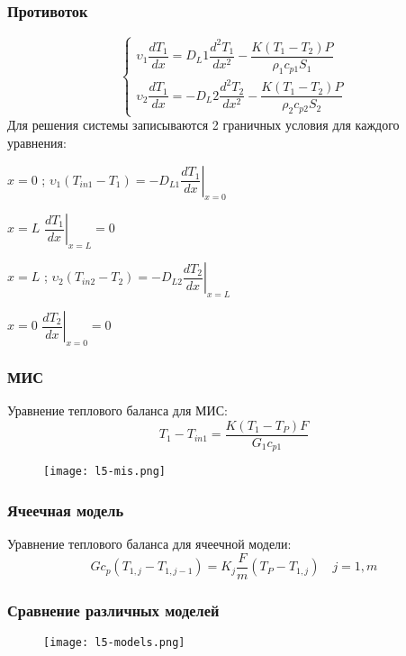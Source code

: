 \begin{frame}
	\frametitle{Противоток}
	\begin{equation}
	\left\lbrace 
	\begin{gathered} 
	\upsilon_1 \dfrac {dT_1} {dx} = D_L1 \dfrac {d^2 T_1} {dx^2} - \dfrac {K(T_1-T_2) P} {\rho_1 c_{p1} S_1} \\
	\upsilon_2 \dfrac {dT_1} {dx} = - D_L2 \dfrac {d^2 T_2} {dx^2} - \dfrac {K(T_1-T_2) P} {\rho_2 c_{p2} S_2} 
	\end{gathered} 
	\right.
	\end{equation}
	Для решения системы записываются 2 граничных условия для каждого уравнения:
	
	$x=0$ ; \quad $\upsilon_1 ( T_{in1} - T_1 ) = -D_{L1} \left.  \dfrac { d T_1 } { dx }  \right| _{ x=0 }$
	
	$x=L$ \quad $ \left. \dfrac { d T_1 } { dx }  \right|_{ x=L } =0$
	
	$x=L$ ; \quad $\upsilon_2 ( T_{in2} - T_2 ) = -D_{L2} \left.  \dfrac { d T_2 } { dx }  \right| _{ x=L }$
	
	$x=0$ \quad $ \left. \dfrac { d T_2 } { dx }  \right|_{ x=0 } =0$
	
\end{frame}

\begin{frame}
	\frametitle{МИС}
	Уравнение теплового баланса для МИС:
	\begin{equation}
		T_1-T_{in 1}=\dfrac { K(T_1 - T_{P} )F} { G_1 c_{p1} }
	\end{equation}
	
	\begin{figure}[h]
		\texttt{[image: l5-mis.png]}
	\end{figure}
\end{frame}

\begin{frame}
	\frametitle{Ячеечная модель}
	Уравнение теплового баланса для ячеечной модели:
	\begin{equation}
		G c_p ( T_{1,j} - T_{1,j-1} ) = K_j \dfrac {F} {m} ( T_P - T_{1,j} ) \quad j=1,m
	\end{equation}
\end{frame}


\begin{frame}
	\frametitle{Сравнение различных моделей}
	\begin{figure}[h]
	\texttt{[image: l5-models.png]}
	\end{figure}
\end{frame}

